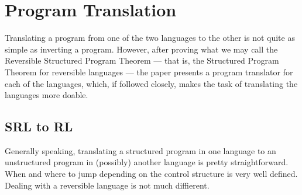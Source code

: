 \section{Program Translation}
Translating a program from one of the two languages to the other is not quite as simple as inverting a program. However, after proving what we may call the Reversible Structured Program Theorem --- that is, the Structured Program Theorem for reversible languages --- the paper \cite{REV} presents a program translator for each of the languages, which, if followed closely, makes the task of translating the languages more doable.

\subsection{SRL to RL}

Generally speaking, translating a structured program in one language to an unstructured program in (possibly) another language is pretty straightforward. When and where to jump depending on the control structure is very well defined. Dealing with a reversible language is not much diffierent.

